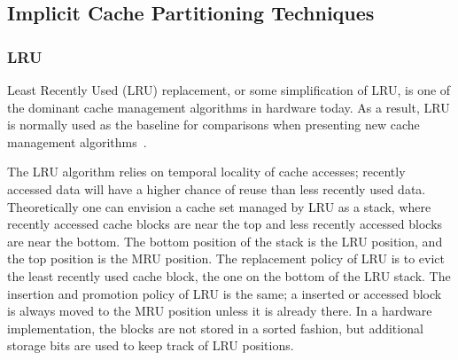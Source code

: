 




\subsection{Implicit Cache Partitioning Techniques}

\subsubsection{LRU}

Least Recently Used (LRU) replacement, or some simplification of LRU, is one of the dominant cache management algorithms in hardware today. 
As a result, LRU is normally used as the baseline for comparisons when presenting new cache management algorithms~\cite{Jaleel2010,Qureshi2006,Qureshi2007}.

The LRU algorithm relies on temporal locality of cache accesses; recently accessed data will have a higher chance of reuse than less recently used data.
Theoretically one can envision a cache set managed by LRU as a stack, where recently accessed cache blocks are near the top and less recently accessed blocks are near the bottom.
The bottom position of the stack is the LRU position, and the top position is the MRU position.
The replacement policy of LRU is to evict the least recently used cache block, the one on the bottom of the LRU stack.
The insertion and promotion policy of LRU is the same; a inserted or accessed block is always moved to the MRU position unless it is already there.
In a hardware implementation, the blocks are not stored in a sorted fashion, but additional storage bits are used to keep track of LRU positions.

